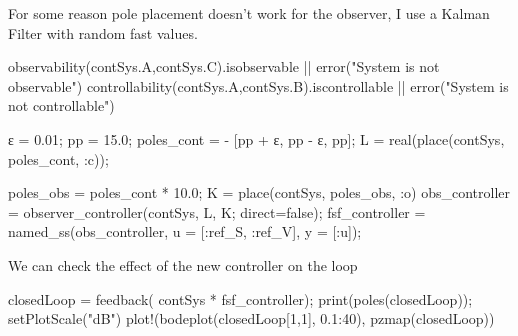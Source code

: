 \documentclass[
  8pt,
  a4paper,
]{book}
\newenvironment{Shaded}{\begin{snugshade}}{\end{snugshade}}
\newcommand{\ConstantTok}[1]{\textcolor[rgb]{0.56,0.35,0.01}{#1}}
\newcommand{\FloatTok}[1]{\textcolor[rgb]{0.68,0.00,0.00}{#1}}
\newcommand{\FunctionTok}[1]{\textcolor[rgb]{0.28,0.35,0.67}{#1}}
\newcommand{\NormalTok}[1]{\textcolor[rgb]{0.00,0.23,0.31}{#1}}
\newcommand{\OperatorTok}[1]{\textcolor[rgb]{0.37,0.37,0.37}{#1}}
\newcommand{\StringTok}[1]{\textcolor[rgb]{0.13,0.47,0.30}{#1}}
\begin{document}
For some reason pole placement doesn't work for the observer, I use a
Kalman Filter with random fast values.

\begin{Shaded}
\begin{Highlighting}[]
\FunctionTok{observability}\NormalTok{(contSys.A,contSys.C).isobservable }\OperatorTok{||} \FunctionTok{error}\NormalTok{(}\StringTok{"System is not observable"}\NormalTok{)}
\FunctionTok{controllability}\NormalTok{(contSys.A,contSys.B).iscontrollable }\OperatorTok{||} \FunctionTok{error}\NormalTok{(}\StringTok{"System is not controllable"}\NormalTok{)}

\NormalTok{ε }\OperatorTok{=} \FloatTok{0.01}\NormalTok{;}
\NormalTok{pp }\OperatorTok{=} \FloatTok{15.0}\NormalTok{;}
\NormalTok{poles\_cont }\OperatorTok{=} \OperatorTok{{-}}\NormalTok{ [pp }\OperatorTok{+}\NormalTok{ ε, pp }\OperatorTok{{-}}\NormalTok{ ε, pp];}
\NormalTok{L }\OperatorTok{=} \FunctionTok{real}\NormalTok{(}\FunctionTok{place}\NormalTok{(contSys, poles\_cont, }\OperatorTok{:}\NormalTok{c));}


\NormalTok{poles\_obs }\OperatorTok{=}\NormalTok{ poles\_cont }\OperatorTok{*} \FloatTok{10.0}\NormalTok{;}
\NormalTok{K }\OperatorTok{=} \FunctionTok{place}\NormalTok{(contSys, poles\_obs, }\OperatorTok{:}\NormalTok{o)}
\NormalTok{obs\_controller }\OperatorTok{=} \FunctionTok{observer\_controller}\NormalTok{(contSys, L, K; direct}\OperatorTok{=}\ConstantTok{false}\NormalTok{);}
\NormalTok{fsf\_controller }\OperatorTok{=} \FunctionTok{named\_ss}\NormalTok{(obs\_controller, u }\OperatorTok{=}\NormalTok{ [}\OperatorTok{:}\NormalTok{ref\_S, }\OperatorTok{:}\NormalTok{ref\_V], y }\OperatorTok{=}\NormalTok{ [}\OperatorTok{:}\NormalTok{u]);}
\end{Highlighting}
\end{Shaded}

We can check the effect of the new controller on the loop

\begin{Shaded}
\begin{Highlighting}[]
\NormalTok{closedLoop }\OperatorTok{=} \FunctionTok{feedback}\NormalTok{( contSys }\OperatorTok{*}\NormalTok{ fsf\_controller);}
\FunctionTok{print}\NormalTok{(}\FunctionTok{poles}\NormalTok{(closedLoop));}
\FunctionTok{setPlotScale}\NormalTok{(}\StringTok{"dB"}\NormalTok{)}
\FunctionTok{plot!}\NormalTok{(}\FunctionTok{bodeplot}\NormalTok{(closedLoop[}\FloatTok{1}\NormalTok{,}\FloatTok{1}\NormalTok{], }\FloatTok{0.1}\OperatorTok{:}\FloatTok{40}\NormalTok{), }\FunctionTok{pzmap}\NormalTok{(closedLoop))}
\end{Highlighting}
\end{Shaded}
\end{document}
